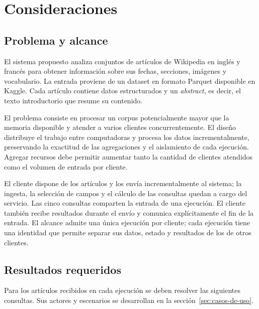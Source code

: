 \section{Consideraciones}
\label{sec:consideraciones}

\subsection{Problema y alcance}

El sistema propuesto analiza conjuntos de artículos de Wikipedia en inglés y
francés para obtener información sobre sus fechas, secciones, imágenes y
vocabulario. La entrada proviene de un dataset en formato Parquet disponible
en Kaggle. Cada artículo contiene datos estructurados y un \emph{abstract},
es decir, el texto introductorio que resume su contenido.

El problema consiste en procesar un corpus potencialmente mayor que la memoria
disponible y atender a varios clientes concurrentemente. El diseño distribuye
el trabajo entre computadoras y procesa los datos incrementalmente, preservando
la exactitud de las agregaciones y el aislamiento de cada ejecución.
Agregar recursos debe permitir aumentar tanto la cantidad de clientes
atendidos como el volumen de entrada por cliente.

El cliente dispone de los artículos y los envía incrementalmente al sistema;
la ingesta, la selección de campos y el cálculo de las consultas quedan a cargo
del servicio. Las cinco consultas comparten la entrada de una ejecución.
El cliente también recibe resultados durante el envío y comunica explícitamente
el fin de la entrada. El alcance admite una única ejecución por cliente;
cada ejecución tiene una identidad que permite separar sus datos, estado y
resultados de los de otros clientes.

\subsection{Resultados requeridos}

Para los artículos recibidos en cada ejecución se deben resolver las siguientes
consultas. Sus actores y escenarios se desarrollan en la
sección~\ref{sec:casos-de-uso}.

